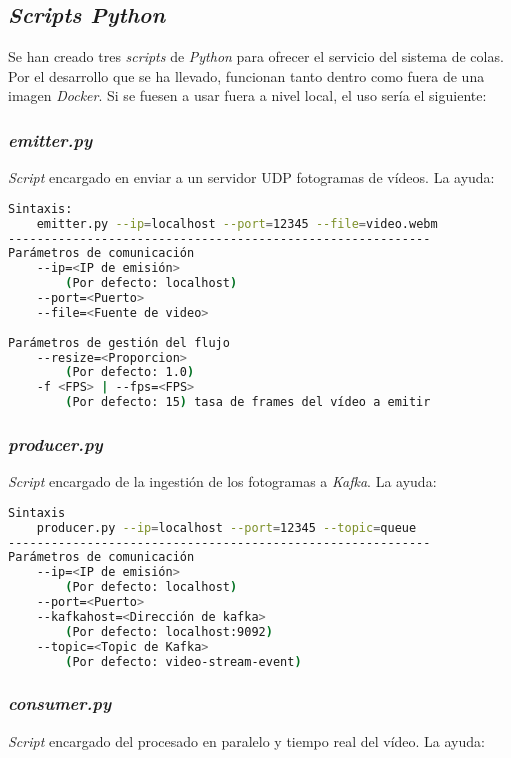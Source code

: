 \subsection{\textit{Scripts Python} }
Se han creado tres \textit{scripts} de \textit{Python} para ofrecer el servicio del sistema de colas. Por el desarrollo que se ha llevado, funcionan tanto dentro como fuera de una imagen \textit{Docker}. Si se fuesen a usar fuera a nivel local, el uso sería el siguiente:

\subsubsection{\textit{emitter.py}}
\textit{Script} encargado en enviar a un servidor UDP fotogramas de vídeos. La ayuda:

\begin{lstlisting}[language=Bash]
Sintaxis:
	emitter.py --ip=localhost --port=12345 --file=video.webm
-----------------------------------------------------------
Parámetros de comunicación
	--ip=<IP de emisión> 
		(Por defecto: localhost)
	--port=<Puerto>
	--file=<Fuente de video>
	
Parámetros de gestión del flujo
    --resize=<Proporcion> 
    	(Por defecto: 1.0)
    -f <FPS> | --fps=<FPS> 
    	(Por defecto: 15) tasa de frames del vídeo a emitir
\end{lstlisting}

\subsubsection{\textit{producer.py}}
\textit{Script} encargado de la ingestión de los fotogramas a \textit{Kafka}. La ayuda:

\begin{lstlisting}[language=Bash]
Sintaxis
	producer.py --ip=localhost --port=12345 --topic=queue 
-----------------------------------------------------------
Parámetros de comunicación
	--ip=<IP de emisión> 
		(Por defecto: localhost)
	--port=<Puerto>
	--kafkahost=<Dirección de kafka> 
		(Por defecto: localhost:9092)
	--topic=<Topic de Kafka> 
		(Por defecto: video-stream-event)
\end{lstlisting}

\subsubsection{\textit{consumer.py}}
\textit{Script} encargado del procesado en paralelo y tiempo real del vídeo. La ayuda:

